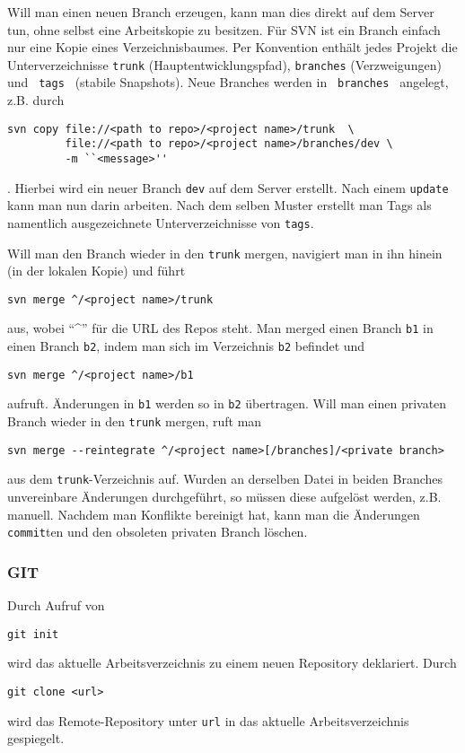 \documentclass{scrartcl}
\begin{document}
Will man einen neuen Branch erzeugen, kann man dies direkt auf dem Server tun,
ohne selbst eine Arbeitskopie zu besitzen. Für SVN ist ein Branch einfach nur
eine Kopie eines Verzeichnisbaumes. Per Konvention enthält jedes Projekt die
Unterverzeichnisse \texttt{trunk} (Hauptentwicklungspfad), \texttt{branches}
(Verzweigungen) und \texttt{ tags } (stabile Snapshots). Neue Branches werden in
\texttt{ branches } angelegt, z.B. durch 
\begin{lstlisting}
svn copy file://<path to repo>/<project name>/trunk  \
         file://<path to repo>/<project name>/branches/dev \
         -m ``<message>''
\end{lstlisting} . Hierbei wird ein neuer Branch 
\texttt{dev} auf dem Server erstellt. Nach einem \texttt{update} kann man nun
darin arbeiten. Nach dem selben Muster erstellt man Tags als namentlich
ausgezeichnete Unterverzeichnisse von \texttt{tags}.

Will man den Branch wieder in den \texttt{trunk} mergen,
navigiert man in ihn hinein (in der lokalen Kopie) und führt
\begin{lstlisting}
svn merge ^/<project name>/trunk
\end{lstlisting} aus, wobei ``\^{}'' für die URL des Repos steht. 
Man merged einen Branch \texttt{b1} in einen Branch \texttt{b2}, indem man sich
im Verzeichnis \texttt{b2} befindet und 
\begin{lstlisting}
svn merge ^/<project name>/b1
\end{lstlisting}
aufruft. Änderungen in \texttt{b1} werden so in \texttt{b2} übertragen. Will man
einen privaten Branch wieder in den \texttt{trunk} mergen, ruft man
\begin{lstlisting}
svn merge --reintegrate ^/<project name>[/branches]/<private branch>
\end{lstlisting} aus dem \texttt{trunk}-Verzeichnis auf.
Wurden an derselben Datei in beiden Branches unvereinbare Änderungen
durchgeführt, so müssen diese aufgelöst werden, z.B. manuell. Nachdem man
Konflikte bereinigt hat, kann man die Änderungen \texttt{commit}ten und den
obsoleten privaten Branch löschen.


\subsubsection{GIT}
Durch Aufruf von
\begin{lstlisting}
git init
\end{lstlisting} 
wird das aktuelle Arbeitsverzeichnis zu einem neuen Repository deklariert. Durch
\begin{lstlisting}
git clone <url>
\end{lstlisting} 
wird das Remote-Repository unter \texttt{url} in das aktuelle Arbeitsverzeichnis gespiegelt.
\end{document}
